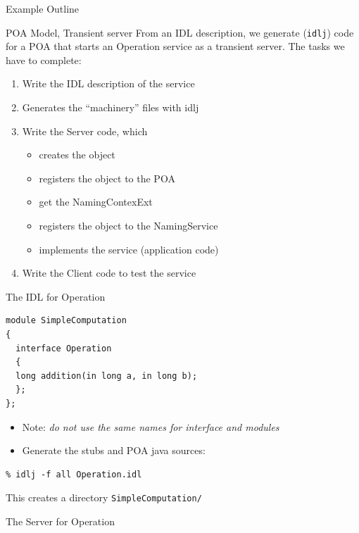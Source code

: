\documentclass[bigger,hyperref={colorlinks=true, urlcolor=red, plainpages=false, pdfpagelabels, bookmarksnumbered}]{beamer}
\begin{document}
\begin{frame}[fragile,label=sec-4-23]{Example Outline}
 \begin{block}{POA Model, Transient server}
From an IDL description, we generate (\texttt{idlj}) code for a POA that starts an
Operation service as a transient server. The tasks we have to complete:
\begin{enumerate}
\item Write the IDL description of the service
\item Generates the “machinery” files with idlj
\item Write the Server code, which
\begin{itemize}
\item creates the object
\item registers the object to the POA
\item get the NamingContexExt
\item registers the object to the NamingService
\item implements the service (application code)
\end{itemize}
\item Write the Client code to test the service
\end{enumerate}
\end{block}
\end{frame}

\begin{frame}[fragile,label=sec-4-24]{The IDL for Operation}
 \lstset{language=java,label= ,caption= ,numbers=none}
\begin{lstlisting}
module SimpleComputation
{
  interface Operation
  {
  long addition(in long a, in long b);
  };
};
\end{lstlisting}

\begin{itemize}
\item Note: \emph{do not use the same names for interface and modules}
\item Generate the stubs and POA java sources:
\end{itemize}

\lstset{language=bash,label= ,caption= ,numbers=none}
\begin{lstlisting}
% idlj -f all Operation.idl
\end{lstlisting}
This creates a directory \texttt{SimpleComputation/}
\end{frame}

\begin{frame}[fragile,label=sec-4-25]{The Server for Operation}

 \end{frame}
\end{document}
